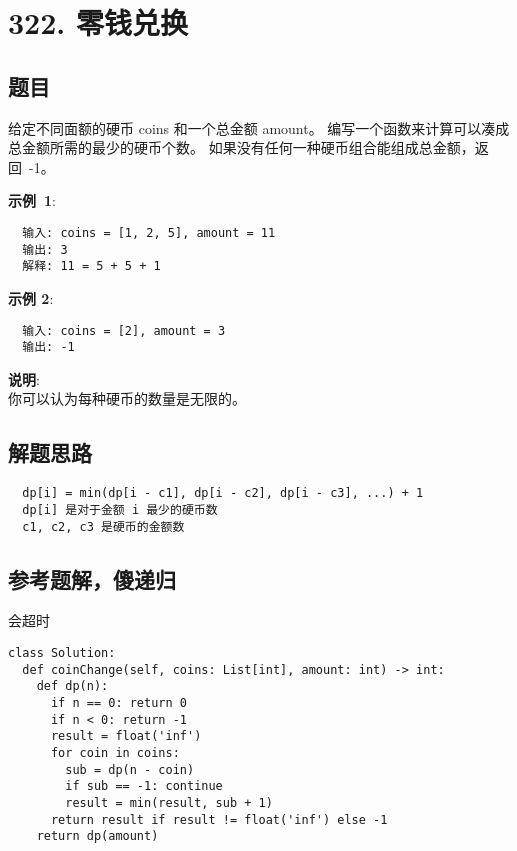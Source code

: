 \newpage
\section{322. 零钱兑换}
\label{leetcode:322}

\subsection{题目}

给定不同面额的硬币 coins 和一个总金额 amount。
编写一个函数来计算可以凑成总金额所需的最少的硬币个数。
如果没有任何一种硬币组合能组成总金额，返回 -1。

\textbf{示例 1}:

\begin{verbatim}
  输入: coins = [1, 2, 5], amount = 11
  输出: 3
  解释: 11 = 5 + 5 + 1
\end{verbatim}

\textbf{示例 2}:

\begin{verbatim}
  输入: coins = [2], amount = 3
  输出: -1
\end{verbatim}

\textbf{说明}: \\
你可以认为每种硬币的数量是无限的。

\subsection{解题思路}

\begin{verbatim}
  dp[i] = min(dp[i - c1], dp[i - c2], dp[i - c3], ...) + 1
  dp[i] 是对于金额 i 最少的硬币数
  c1, c2, c3 是硬币的金额数
\end{verbatim}

\subsection{参考题解，傻递归}

会超时

\begin{verbatim}
class Solution:
  def coinChange(self, coins: List[int], amount: int) -> int:
    def dp(n):
      if n == 0: return 0
      if n < 0: return -1
      result = float('inf')
      for coin in coins:
        sub = dp(n - coin)
        if sub == -1: continue
        result = min(result, sub + 1)
      return result if result != float('inf') else -1
    return dp(amount)
\end{verbatim}

